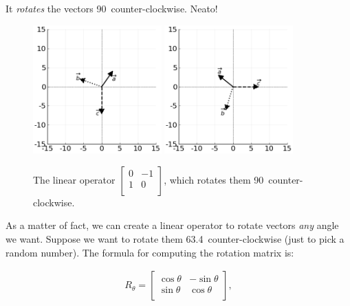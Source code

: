 It \textit{rotates} the vectors 90\textdegree\ counter-clockwise. Neato!

\begin{figure}[ht]
\centering
\vspace{.2in}
\includegraphics[width=0.44\textwidth]{preoperators.png}
\includegraphics[width=0.44\textwidth]{rotate90op.png}
\caption[.]{The linear operator 
{\scriptsize $\begin{bmatrix} 0 & -1 \\ 1 & 0 \\
\end{bmatrix}$,} which rotates them 90\textdegree\ counter-clockwise.}
\label{fig:rotate90op}
\end{figure}


As a matter of fact, we can create a linear operator to rotate vectors
\textit{any} angle we want. Suppose we want to rotate them 63.4\textdegree\ 
counter-clockwise (just to pick a random number). The formula for computing the
rotation matrix is:

\vspace{-.15in}
\begin{align*}
R_{\theta} =
\begin{bmatrix}
\cos \theta & -\sin \theta \\
\sin \theta & \cos \theta \\
\end{bmatrix},
\end{align*}
\vspace{-.15in}

